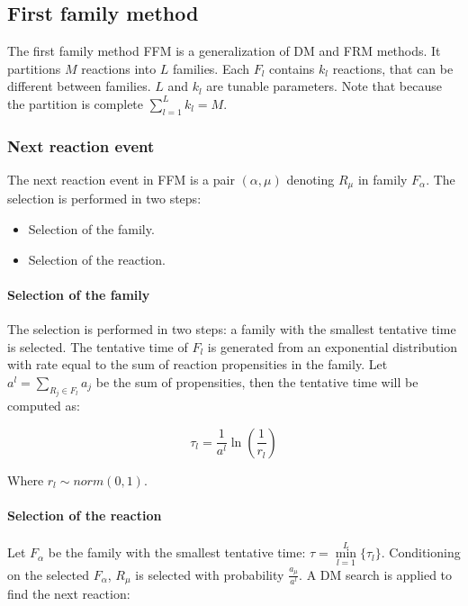   \subsection{First family method}
  The first family method FFM is a generalization of DM and FRM methods.
  It partitions $M$ reactions into $L$ families.
  Each $F_l$ contains $k_l$ reactions, that can be different between families.
  $L$ and $k_l$ are tunable parameters.
  Note that because the partition is complete $\sum\limits_{l=1}^Lk_l = M$.

    \subsubsection{Next reaction event}
    The next reaction event in FFM is a pair $(\alpha, \mu)$ denoting $R_\mu$ in family $F_\alpha$.
    The selection is performed in two steps:

    \begin{multicols}{2}
      \begin{itemize}
        \item Selection of the family.
        \item Selection of the reaction.
      \end{itemize}
    \end{multicols}

      \paragraph{Selection of the family}
      The selection is performed in two steps: a family with the smallest tentative time is selected.
      The tentative time of $F_l$ is generated from an exponential distribution with rate equal to the sum of reaction propensities in the family.
      Let $a^l = \sum\limits_{R_j\in F_l}a_j$ be the sum of propensities, then the tentative time will be computed as:

      $$\tau_l = \frac{1}{a^l}\ln\left(\frac{1}{r_l}\right)$$

      Where $r_l\sim norm(0,1)$.

      \paragraph{Selection of the reaction}
      Let $F_\alpha$ be the family with the smallest tentative time: $\tau = \min\limits_{l=1}^L\{\tau_l\}$.
      Conditioning on the selected $F_\alpha$, $R_\mu$ is selected with probability $\frac{a_\mu}{a^l}$.
      A DM search is applied to find the next reaction:


